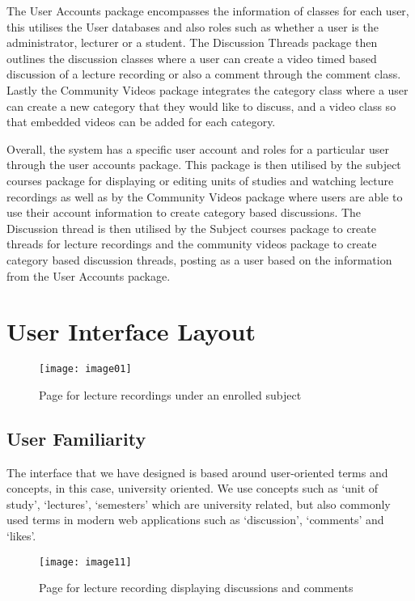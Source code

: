\documentclass{article}
\begin{document}
The User Accounts package encompasses the information of classes for each user, this utilises the User databases and also roles such as whether a user is the administrator, lecturer or a student. The Discussion Threads package then outlines the discussion classes where a user can create a video timed based discussion of a lecture recording or also a comment through the comment class. Lastly the Community Videos package integrates the category class where a user can create a new category that they would like to discuss, and a video class so that embedded videos can be added for each category.

Overall, the system has a specific user account and roles for a particular user through the user accounts package. This package is then utilised by the subject courses package for displaying or editing units of studies and watching lecture recordings as well as by the Community Videos package where users are able to use their account information to create category based discussions.  The Discussion thread is then utilised by the Subject courses package to create threads for lecture recordings and the community videos package to create category based discussion threads, posting as a user based on the information from the User Accounts package.

\section{User Interface Layout}
\begin{figure}[h!]
\centering
\texttt{[image: image01]}
\caption{Page for lecture recordings under an enrolled subject}
\end{figure}

\subsection{User Familiarity}
The interface that we have designed is based around user-oriented terms and concepts, in this case, university oriented. We use concepts such as `unit of study', `lectures', `semesters' which are university related, but also commonly used terms in modern web applications such as `discussion', `comments' and `likes'.

\begin{figure}[h!]
\centering
\texttt{[image: image11]}
\caption{Page for lecture recording displaying discussions and comments}
\end{figure}
\end{document}
